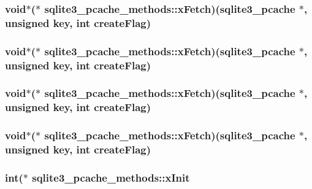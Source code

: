 \subsubsection{\setlength{\rightskip}{0pt plus 5cm}void$\ast$($\ast$ \bf{sqlite3\_\-pcache\_\-methods::x\-Fetch})(\bf{sqlite3\_\-pcache} $\ast$, unsigned key, int create\-Flag)}\label{structsqlite3__pcache__methods_d10fad8e8e57156196af8eacd7dc66e7}


\subsubsection{\setlength{\rightskip}{0pt plus 5cm}void$\ast$($\ast$ \bf{sqlite3\_\-pcache\_\-methods::x\-Fetch})(\bf{sqlite3\_\-pcache} $\ast$, unsigned key, int create\-Flag)}\label{structsqlite3__pcache__methods_d10fad8e8e57156196af8eacd7dc66e7}


\subsubsection{\setlength{\rightskip}{0pt plus 5cm}void$\ast$($\ast$ \bf{sqlite3\_\-pcache\_\-methods::x\-Fetch})(\bf{sqlite3\_\-pcache} $\ast$, unsigned key, int create\-Flag)}\label{structsqlite3__pcache__methods_d10fad8e8e57156196af8eacd7dc66e7}


\subsubsection{\setlength{\rightskip}{0pt plus 5cm}void$\ast$($\ast$ \bf{sqlite3\_\-pcache\_\-methods::x\-Fetch})(\bf{sqlite3\_\-pcache} $\ast$, unsigned key, int create\-Flag)}\label{structsqlite3__pcache__methods_d10fad8e8e57156196af8eacd7dc66e7}


\subsubsection{\setlength{\rightskip}{0pt plus 5cm}int($\ast$ \bf{sqlite3\_\-pcache\_\-methods::x\-Init}}\label{structsqlite3__pcache__methods_d3b34fae7c37d4a2dbea164e4ba0da45}


